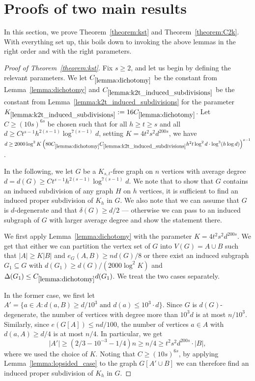 \documentclass[10pt, a4paper]{article}
\numberwithin{theorem}{section} %
\theoremstyle{remark}
\theoremstyle{definition}
\begin{document}
\section{Proofs of two main results}\label{sec:main_proofs}
In this section, we prove Theorem~\ref{theorem:kst} and Theorem~\ref{theorem:C2k}.
With everything set up, this boils down to invoking the above lemmas in the right order and with the right parameters.
\begin{proof}[Proof of Theorem~\ref{theorem:kst}]
    Fix $s \geq 2$, and let us begin by defining the relevant parameters.
    We let $C_{\ref{lemma:dichotomy}}$ be the constant from Lemma~\ref{lemma:dichotomy} and $C_{\ref{lemma:k2t_induced_subdivisions}}$ be the constant from Lemma~\ref{lemma:k2t_induced_subdivisions} for the parameter $K_{\ref{lemma:k2t_induced_subdivisions}}:= 16C_{\ref{lemma:dichotomy}}$.
    Let $C \geq(10s)^{6s}$ be chosen such that for all $h \geq t \geq s$ and all $d \geq C t^{s-1}h^{2(s-1)}\log^{7(s-1)}d$, setting $K = 4t^2s^2d^{200s}$, we have $d \geq 2000\log^2K \left( 80C_{\ref{lemma:dichotomy}}C_{\ref{lemma:k2t_induced_subdivisions}}h^2t \log^2 d \cdot \log^3(h\log d) \right)^{s-1}$.

    In the following, we let $G$ be a $K_{s, t}$-free graph on $n$ vertices with average degree $d = d(G) \geq Ct^{s-1}h^{2(s-1)}\log^{7(s-1)}d$.
    We note that to show that $G$ contains an induced subdivision of any graph $H$ on $h$ vertices, it is sufficient to find an induced proper subdivision of $K_h$ in $G$.
    We also note that we can assume that $G$ is $d$-degenerate and that $\delta(G) \geq d/2$ --- otherwise we can pass to an induced subgraph of $G$ with larger average degree and show the statement there.

    We first apply Lemma~\ref{lemma:dichotomy} with the parameter $K = 4t^2s^2d^{200s}$.
    We get that either we can partition the vertex set of $G$ into $V(G) = A \cup B$ such that $|A| \geq K|B|$ and $e_G(A, B) \geq nd(G)/8$ or there exist an induced subgraph $G_1 \subseteq G$ with $d(G_1) \geq d(G) / (2000\log^2 K)$ and $\Delta(G_1) \leq C_{\ref{lemma:dichotomy}}d(G_1)$.
    We treat the two cases separately.

    In the former case, we first let $A' = \{ a \in A:d(a, B) \geq d/10^3 \text{ and } d(a) \leq 10^3\cdot d \}$.
    Since $G$ is $d(G)$-degenerate, the number of vertices with degree more than $10^3d$ is at most $n/10^3$.
    Similarly, since $e(G[A])\leq nd/100$, the number of vertices $a \in A$ with $d(a, A) \geq d/4$ is at most $n/4$.
    In particular, we get 
    \[  
    |A'| \geq (2/3-10^{-3}-1/4)n \geq n/4 \geq t^2s^2d^{200s}\cdot |B|,
    \]
    where we used the choice of $K$.
    Noting that $C \geq (10s)^{6s}$, by applying Lemma~\ref{lemma:lopsided_case} to the graph $G[A' \cup B]$ we can therefore find an induced proper subdivision of $K_h$ in $G$.


\end{proof}
\end{document}
